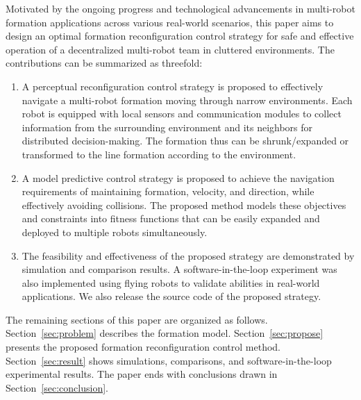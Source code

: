Motivated by the ongoing progress and technological advancements in multi-robot formation applications across various real-world scenarios, this paper aims to design an optimal formation reconfiguration control strategy for safe and effective operation of a decentralized multi-robot team in cluttered environments. The contributions can be summarized as threefold:
\begin{enumerate}
    \item A perceptual reconfiguration control strategy is proposed to effectively navigate a multi-robot formation moving through narrow environments. Each robot is equipped with local sensors and communication modules to collect information from the surrounding environment and its neighbors for distributed decision-making. The formation thus can be shrunk/expanded or transformed to the line formation according to the environment.
        \item A model predictive control strategy is proposed to achieve the navigation requirements of maintaining formation, velocity, and direction, while effectively avoiding collisions. The proposed method models these objectives and constraints into fitness functions that can be easily expanded and deployed to multiple robots simultaneously.
    \item The feasibility and effectiveness of the proposed strategy are demonstrated by simulation and comparison results. A software-in-the-loop experiment was also implemented using flying robots to validate abilities in real-world applications. We also release the source code of the proposed strategy.
\end{enumerate}

The remaining sections of this paper are organized as follows. Section~\ref{sec:problem} describes the formation model. Section~\ref{sec:propose} presents the proposed formation reconfiguration control method. Section~\ref{sec:result} shows simulations, comparisons, and software-in-the-loop experimental results. The paper ends with conclusions drawn in Section~\ref{sec:conclusion}.
